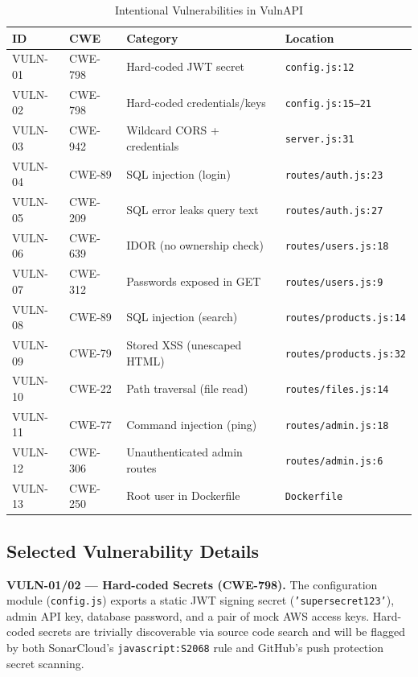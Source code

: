 \documentclass[10pt,conference]{IEEEtran}
\begin{document}
\begin{table}[t]
  \caption{Intentional Vulnerabilities in VulnAPI}
  \label{tab:vulns}
  \centering
  \scriptsize
  \begin{tabular}{@{}llll@{}}
    \toprule
    ID & CWE & Category & Location \\
    \midrule
    VULN-01 & CWE-798 & Hard-coded JWT secret        & \texttt{config.js:12} \\
    VULN-02 & CWE-798 & Hard-coded credentials/keys  & \texttt{config.js:15--21} \\
    VULN-03 & CWE-942 & Wildcard CORS + credentials  & \texttt{server.js:31} \\
    VULN-04 & CWE-89  & SQL injection (login)        & \texttt{routes/auth.js:23} \\
    VULN-05 & CWE-209 & SQL error leaks query text   & \texttt{routes/auth.js:27} \\
    VULN-06 & CWE-639 & IDOR (no ownership check)   & \texttt{routes/users.js:18} \\
    VULN-07 & CWE-312 & Passwords exposed in GET     & \texttt{routes/users.js:9} \\
    VULN-08 & CWE-89  & SQL injection (search)       & \texttt{routes/products.js:14} \\
    VULN-09 & CWE-79  & Stored XSS (unescaped HTML)  & \texttt{routes/products.js:32} \\
    VULN-10 & CWE-22  & Path traversal (file read)  & \texttt{routes/files.js:14} \\
    VULN-11 & CWE-77  & Command injection (ping)    & \texttt{routes/admin.js:18} \\
    VULN-12 & CWE-306 & Unauthenticated admin routes & \texttt{routes/admin.js:6} \\
    VULN-13 & CWE-250 & Root user in Dockerfile      & \texttt{Dockerfile} \\
    \bottomrule
  \end{tabular}
\end{table}

\subsection{Selected Vulnerability Details}

\textbf{VULN-01/02 — Hard-coded Secrets (CWE-798).}
The configuration module (\texttt{config.js}) exports a static JWT signing
secret (\texttt{'supersecret123'}), admin API key, database password, and
a pair of mock AWS access keys.
Hard-coded secrets are trivially discoverable via source code search and
will be flagged by both SonarCloud's \texttt{javascript:S2068} rule and
GitHub's push protection secret scanning.
\end{document}

